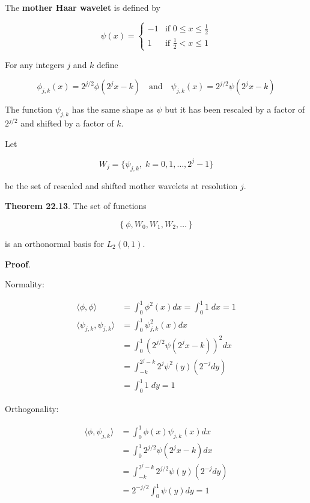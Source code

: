 The \textbf{mother Haar wavelet} is defined by

\[
\psi(x) = \begin{cases}
-1 & \text{if } 0 \leq x \leq \frac{1}{2} \\
1  & \text{if } \frac{1}{2} < x \leq 1
\end{cases}
\]

For any integers \(j\) and \(k\) define

\[ \phi_{j, k}(x) = 2^{j/2} \phi(2^{j} x - k) 
\quad \text{and} \quad
\psi_{j, k}(x) = 2^{j/2} \psi(2^{j} x - k)
\]

The function \(\psi_{j, k}\) has the same shape as \(\psi\) but it has
been rescaled by a factor of \(2^{j/2}\) and shifted by a factor of
\(k\).

Let

\[ W_{j} = \{\psi_{j, k}, \; k = 0, 1, \dots, 2^{j} - 1\} \]

be the set of rescaled and shifted mother wavelets at resolution \(j\).

\textbf{Theorem 22.13}. The set of functions

\[ \left\{ \phi, W_{0}, W_{1}, W_{2}, \dots \right\} \]

is an orthonormal basis for \(L_{2}(0, 1)\).

\textbf{Proof}.

Normality:

\begin{align*}
\langle \phi, \phi \rangle &= \int_{0}^{1} \phi^{2}(x) dx = \int_{0}^{1} 1 \; dx = 1 \\
\langle \psi_{j, k}, \psi_{j, k} \rangle &= \int_{0}^{1} \psi_{j, k}^{2}(x) dx \\
&= \int_{0}^{1} \left( 2^{j / 2} \psi(2^{j} x - k) \right)^{2} dx \\
&= \int_{-k}^{2^{j} - k} 2^{j}  \psi^{2}(y) \left( 2^{-j} dy \right) \\
&= \int_{0}^{1} 1 \; dy = 1
\end{align*}

Orthogonality:

\begin{align*}
\langle \phi, \psi_{j, k} \rangle &= \int_{0}^{1} \phi(x) \psi_{j, k}(x) dx \\
&= \int_{0}^{1}  2^{j / 2} \psi(2^{j} x - k) dx  \\
&= \int_{-k}^{2^{j} - k} 2^{j / 2}  \psi(y) \left( 2^{-j} dy \right) \\
&= 2^{-j/2} \int_{0}^{1} \psi(y) dy = 1
\end{align*}

